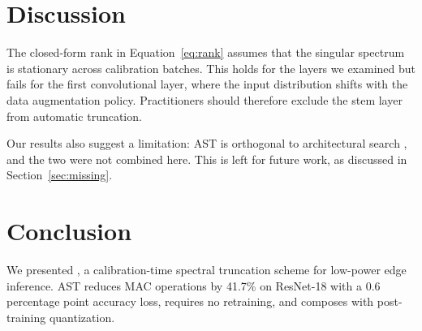 \section{Discussion}
\label{sec:discussion}

The closed-form rank in Equation~\eqref{eq:rank} assumes that the singular spectrum is
stationary across calibration batches. This holds for the layers we examined but fails
for the first convolutional layer, where the input distribution shifts with the
data augmentation policy. Practitioners should therefore exclude the stem layer from
automatic truncation.

Our results also suggest a limitation: AST is orthogonal to architectural search
\citep{tan2019efficientnet}, and the two were not combined here. This is left for
future work, as discussed in Section~\ref{sec:missing}.

\section{Conclusion}
\label{sec:conclusion}

We presented \method{}, a calibration-time spectral truncation scheme for low-power edge
inference. AST reduces MAC operations by 41.7\% on ResNet-18 with a 0.6 percentage point
accuracy loss, requires no retraining, and composes with post-training quantization.
